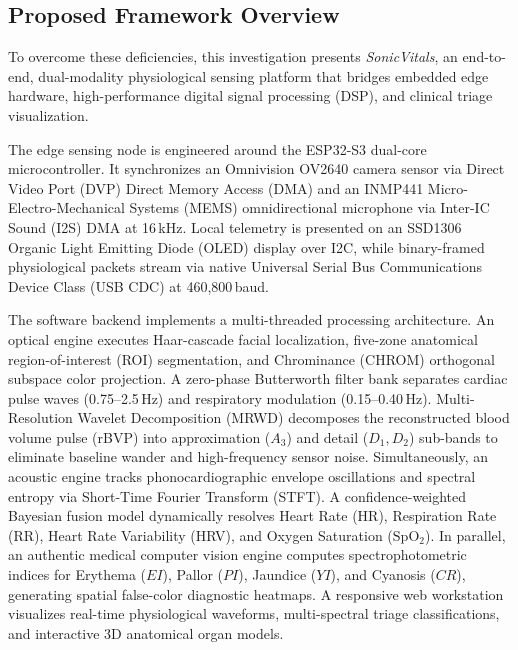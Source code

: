 \documentclass[journal]{IEEEtran}
\begin{document}
\subsection{Proposed Framework Overview}

To overcome these deficiencies, this investigation presents \textit{SonicVitals}, an end-to-end, dual-modality physiological sensing platform that bridges embedded edge hardware, high-performance digital signal processing (DSP), and clinical triage visualization. 

The edge sensing node is engineered around the ESP32-S3 dual-core microcontroller. It synchronizes an Omnivision OV2640 camera sensor via Direct Video Port (DVP) Direct Memory Access (DMA) and an INMP441 Micro-Electro-Mechanical Systems (MEMS) omnidirectional microphone via Inter-IC Sound (I2S) DMA at 16\,kHz. Local telemetry is presented on an SSD1306 Organic Light Emitting Diode (OLED) display over I2C, while binary-framed physiological packets stream via native Universal Serial Bus Communications Device Class (USB CDC) at 460,800\,baud.

The software backend implements a multi-threaded processing architecture. An optical engine executes Haar-cascade facial localization, five-zone anatomical region-of-interest (ROI) segmentation, and Chrominance (CHROM) orthogonal subspace color projection. A zero-phase Butterworth filter bank separates cardiac pulse waves (0.75--2.5\,Hz) and respiratory modulation (0.15--0.40\,Hz). Multi-Resolution Wavelet Decomposition (MRWD) decomposes the reconstructed blood volume pulse (rBVP) into approximation ($A_3$) and detail ($D_1, D_2$) sub-bands to eliminate baseline wander and high-frequency sensor noise. Simultaneously, an acoustic engine tracks phonocardiographic envelope oscillations and spectral entropy via Short-Time Fourier Transform (STFT). A confidence-weighted Bayesian fusion model dynamically resolves Heart Rate (HR), Respiration Rate (RR), Heart Rate Variability (HRV), and Oxygen Saturation ($\mathrm{SpO_2}$). In parallel, an authentic medical computer vision engine computes spectrophotometric indices for Erythema ($EI$), Pallor ($PI$), Jaundice ($YI$), and Cyanosis ($CR$), generating spatial false-color diagnostic heatmaps. A responsive web workstation visualizes real-time physiological waveforms, multi-spectral triage classifications, and interactive 3D anatomical organ models.
\end{document}
